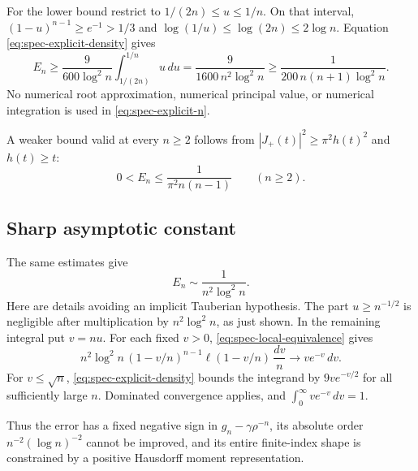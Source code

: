 For the lower bound restrict to $1/(2n)\le u\le1/n$.  On that
interval, $(1-u)^{n-1}\ge e^{-1}>1/3$ and
$\log(1/u)\le\log(2n)\le2\log n$.  Equation
\eqref{eq:spec-explicit-density} gives
\[
 E_n\ge\frac{9}{600\log^2n}
               \int_{1/(2n)}^{1/n}u\,du
      =\frac9{1600\,n^2\log^2n}
      \ge\frac1{200\,n(n+1)\log^2n}.
\]
No numerical root approximation, numerical principal value, or numerical
integration is used in \eqref{eq:spec-explicit-n}.

A weaker bound valid at every $n\ge2$ follows from
$|J_+(t)|^2\ge\pi^2h(t)^2$ and $h(t)\ge t$:
\begin{equation}
 0<E_n\le\frac1{\pi^2 n(n-1)}\qquad(n\ge2).
 \label{eq:spec-global-simple}
\end{equation}

\subsection{Sharp asymptotic constant}

The same estimates give
\begin{equation}
 \boxed{\qquad
 E_n\sim\frac1{n^2\log^2n}.
 \qquad}
 \label{eq:spec-leading}
\end{equation}
Here are details avoiding an implicit Tauberian hypothesis.  The part
$u\ge n^{-1/2}$ is negligible after multiplication by $n^2\log^2n$,
as just shown.  In the remaining integral put $v=nu$.  For each fixed
$v>0$, \eqref{eq:spec-local-equivalence} gives
\[
 n^2\log^2n\,(1-v/n)^{n-1}\ell(1-v/n)\,\frac{dv}{n}
 \longrightarrow ve^{-v}\,dv.
\]
For $v\le\sqrt n$, \eqref{eq:spec-explicit-density} bounds the
integrand by $9ve^{-v/2}$ for all sufficiently large $n$.  Dominated
convergence applies, and $\int_0^\infty ve^{-v}\,dv=1$.

Thus the error has a fixed negative sign in $g_n-\gamma\rho^{-n}$,
its absolute order $n^{-2}(\log n)^{-2}$ cannot be improved, and its
entire finite-index shape is constrained by a positive Hausdorff moment
representation.
